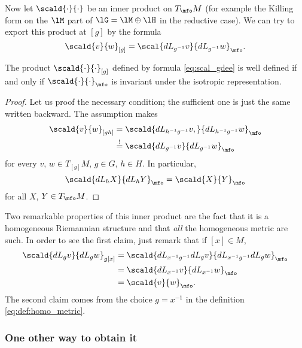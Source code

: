 Now let $\scald{\cdot}{\cdot}$ be an inner product on $T_{\mfo}M$ (for example the Killing form on the $\lM$ part of $\lG=\lM\oplus\lH$ in the reductive case). We can try to export this product at $[g]$ by the formula
\begin{equation}\label{eq:scal_gdee}
  \scald{v}{w}_{[g]}=\scal{dL_{g^{-1}}v}{dL_{g^{-1}}w}_{\mfo}.
\end{equation}

\begin{proposition}
The product $\scald{\cdot}{\cdot}_{[g]}$ defined by formula \eqref{eq:scal_gdee} is well defined if and only if $\scald{\cdot}{\cdot}_{\mfo}$ is invariant under the isotropic representation.
\end{proposition}

\begin{proof}
Let us proof the necessary condition; the sufficient one is just the same written backward. The assumption makes
\begin{equation}
\begin{split}
  \scald{v}{w}_{[gh]}&=\scald{dL_{h^{-1} g^{-1}}v,}{dL_{h^{-1} g^{-1}}w}_{\mfo}\\
                     &\stackrel{!}{=}\scald{dL_{g^{-1}}v}{dL_{g^{-1}}w}_{\mfo}
\end{split}
\end{equation}
for every $v$, $w\in T_{[g]}M$, $g\in G$, $h\in H$. In particular,
\[
   \scald{dL_h X}{dL_hY}_{\mfo}=\scald{X}{Y}_{\mfo}
\]
for all $X$, $Y\in T_{\mfo}M$.
\end{proof}

Two remarkable properties of this inner product are the fact that it is a homogeneous Riemannian structure and that \emph{all} the homogeneous metric are such. In order to see the first claim, just remark that if $[x]\in M$,
\begin{equation}
\begin{split}
\scald{dL_gv}{dL_gw}_{g[x]}&=\scald{dL_{x^{-1} g^{-1}}dL_gv}{dL_{x^{-1} g^{-1}}dL_gw}_{\mfo}\\
                           &=\scald{dL_{x^{-1}}v}{dL_{x^{-1}}w}_{\mfo}\\
                           &=\scald{v}{w}_{\mfo}.
\end{split}
\end{equation}
The second claim comes from the choice $g=x^{-1}$ in the definition \eqref{eq:def:homo_metric}.

\subsubsection{One other way to obtain it}
\label{SubSubSecTheKillingHomo}

